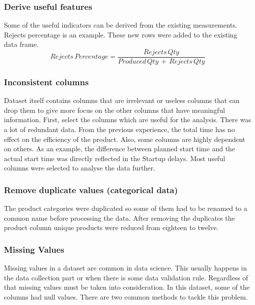 \subsubsection {Derive useful features}
Some of the useful indicators can be derived from the existing measurements. Rejects percentage is an example.  These new rows were added to the existing data frame. 
\begin{equation}\label{rejects_percentage}
    Rejects\,Percentage = \frac{Rejects\,Qty}{Produced\,Qty\,+\,Rejects\,Qty}
\end{equation}
\subsubsection {Inconsistent columns}
Dataset itself contains columns that are irrelevant or useless columns that can drop them to give more focus on the other columns that have meaningful information. First, select the columns which are useful for the analysis. There was a lot of redundant data. From the previous experience, the total time has no effect on the efficiency of the product. Also, some columns are highly dependent on others. As an example, the difference between planned start time and the actual start time was directly reflected in the Startup delays. Most useful columns were selected to analyse the data further. \\
\subsubsection {Remove duplicate values (categorical data)}
The product categories were duplicated so some of them had to be renamed to a common name before processing the data. After removing the duplicates the product column unique products were reduced from eighteen to twelve. \\
\subsubsection {Missing Values}
Missing values in a dataset are common in data science. This usually happens in the data collection part or when there is some data validation rule. Regardless of that missing values must be taken into consideration. In this dataset, some of the columns had null values.
There are two common methods to tackle this problem. \\


